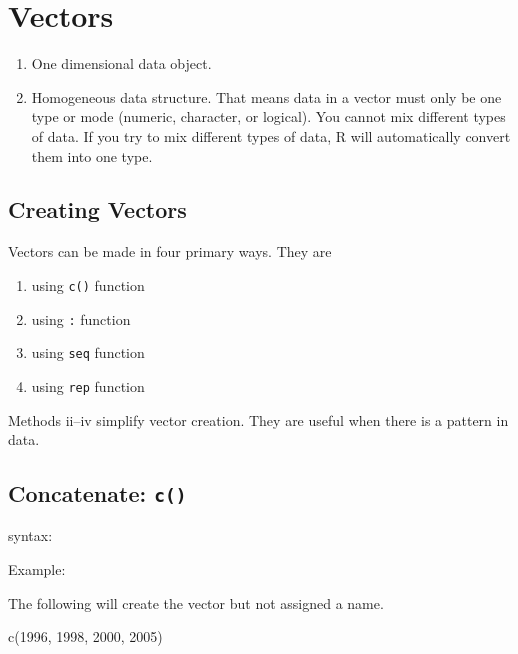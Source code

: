 \documentclass[
  letterpaper,
  DIV=11,
  numbers=noendperiod]{scrreprt}
\newenvironment{Shaded}{\begin{snugshade}}{\end{snugshade}}
\newcommand{\DecValTok}[1]{\textcolor[rgb]{0.68,0.00,0.00}{#1}}
\newcommand{\FunctionTok}[1]{\textcolor[rgb]{0.28,0.35,0.67}{#1}}
\newcommand{\NormalTok}[1]{\textcolor[rgb]{0.00,0.23,0.31}{#1}}
\begin{document}
\section{Vectors}\label{vectors}

\begin{enumerate}
\def\labelenumi{\arabic{enumi}.}
\item
  One dimensional data object.
\item
  Homogeneous data structure. That means data in a vector must only be
  one type or mode (numeric, character, or logical). You cannot mix
  different types of data. If you try to mix different types of data, R
  will automatically convert them into one type.
\end{enumerate}

\subsection{Creating Vectors}\label{creating-vectors}

Vectors can be made in four primary ways. They are

\begin{enumerate}
\def\labelenumi{\roman{enumi}.}
\item
  using \texttt{c()} function
\item
  using \texttt{:} function
\item
  using \texttt{seq} function
\item
  using \texttt{rep} function
\end{enumerate}

Methods ii--iv simplify vector creation. They are useful when there is a
pattern in data.

\subsection{\texorpdfstring{Concatenate:
\texttt{c()}}{Concatenate: c()}}\label{concatenate-c}

syntax:

Example:

The following will create the vector but not assigned a name.

\begin{Shaded}
\begin{Highlighting}[]
\FunctionTok{c}\NormalTok{(}\DecValTok{1996}\NormalTok{, }\DecValTok{1998}\NormalTok{, }\DecValTok{2000}\NormalTok{, }\DecValTok{2005}\NormalTok{)}
\end{Highlighting}
\end{Shaded}
\end{document}
